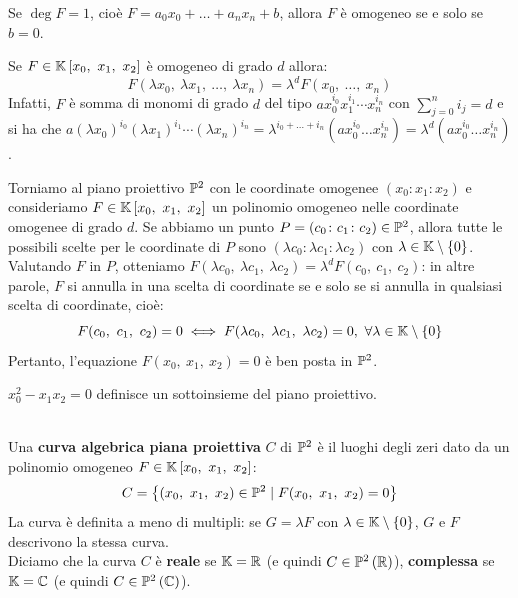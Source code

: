 \begin{observe}
Se $\deg F=1$, cioè $F=a_0x_0+\ldots+a_nx_n+b$, allora $F$ è omogeneo se e solo se $b=0$.
\end{observe}

\begin{observe}
Se $F\in\kamp\left[x_0,\ x_1,\ x_2\right]$ è omogeneo di grado $d$ allora:
\begin{equation}
F(\lambda x_0,\ \lambda x_1,\ \ldots,\ \lambda x_n)=\lambda^d F(x_0,\ \ldots,\ x_n)
\end{equation}
Infatti, $F$ è somma di monomi di grado $d$ del tipo $ax_0^{i_0}x_1^{i_1}\cdots x_n^{i_n}$ con $\displaystyle\sum_{j=0}^n i_j=d$ e si ha che $a(\lambda x_0)^{i_0} (\lambda x_1)^{i_1} \cdots (\lambda x_n)^{i_n}=\lambda^{i_0+\ldots +i_n} (ax_0^{i_0}\ldots x_n^{i_n})=\lambda^d(ax_0^{i_0}\ldots x_n^{i_n})$.
\end{observe}
Torniamo al piano proiettivo $\proj[2]{\ }$ con le coordinate omogenee $(x_0\colon x_1\colon x_2)$ e consideriamo $F\in\kamp\left[x_0,\ x_1,\ x_2\right]$ un polinomio omogeneo nelle coordinate omogenee di grado $d$. Se abbiamo un punto $P=(c_0\colon c_1\colon c_2)\in\proj[2]{\ }$, allora tutte le possibili scelte per le coordinate di $P$ sono $(\lambda c_0\colon \lambda c_1 \colon \lambda c_2)$ con $\lambda\in\mathbb{K}\setminus\{0\}$. Valutando $F$ in $P$, otteniamo $F(\lambda c_0,\ \lambda c_1,\ \lambda c_2)=\lambda^d F(c_0,\ c_1,\ c_2)$: in altre parole, $F$ si annulla in una scelta di coordinate se e solo se si annulla in qualsiasi scelta di coordinate, cioè:
\begin{equation*}
F(c_0,\ c_1,\ c_2)=0\iff F(\lambda c_0,\ \lambda c_1,\ \lambda c_2)=0,\ \forall \lambda\in\mathbb{K}\setminus\{0\}
\end{equation*}
Pertanto, l'equazione $F(x_0,\ x_1,\ x_2)=0$ è ben posta in $\proj[2]{\ }$.
\begin{example}
$x_0^2-x_1x_2=0$ definisce un sottoinsieme del piano proiettivo.
\end{example}
\begin{define}~{}\\
	Una \textbf{curva algebrica piana proiettiva} $C$ di $\proj[2]{\ }$ è il luoghi degli zeri dato da un polinomio omogeneo $F\in\kamp\left[x_0,\ x_1,\ x_2\right]$:
	\begin{equation}
		C=\left\{(x_0,\ x_1,\ x_2)\in\proj[2]{\ }\mid F(x_0,\ x_1,\ x_2)=0\right\}
	\end{equation}
	La curva è definita a meno di multipli: se $G=\lambda F$ con $\lambda\in\mathbb{K}\setminus\left\{0\right\}$, $G$ e $F$ descrivono la stessa curva.\\
	Diciamo che la curva $C$ è \textbf{reale} se $\mathbb{K}=\mathbb{R}$ (e quindi $C\in\proj[2]{\realset}$), \textbf{complessa} se $\mathbb{K}=\mathbb{C}$ (e quindi $C\in\proj[2]{\complexset}$).
\end{define}
